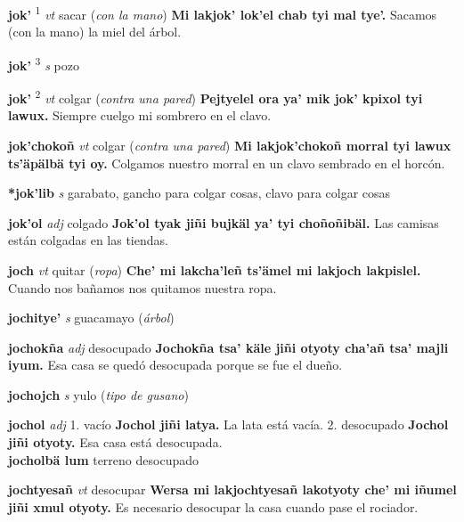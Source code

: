 \documentclass[10pt]{scrbook}
\newcommand{\entry}[1]{\textbf{#1}}
\newcommand{\onedefinition}[1]{#1.}
\newcommand{\defsuperscript}[1]{\textsuperscript{#1}}
\newcommand{\partofspeech}[1]{\textit{#1}}
\newcommand{\spanishtranslation}[1]{#1}
\newcommand{\clarification}[1]{(\textit{#1})}
\newcommand{\cholexample}[1]{\textbf{#1}}
\newcommand{\exampletranslation}[1]{#1}
\newcommand{\secondaryentry}[1]{\\\textbf{#1}}
\newcommand{\secondtranslation}[1]{#1}
\begin{document}
\begin{multicols}{2}
\entry{jok'}
\defsuperscript{1}
\partofspeech{vt}
\spanishtranslation{sacar}
\clarification{con la mano}
\cholexample{Mi lakjok' lok'el chab tyi mal tye'.}
\exampletranslation{Sacamos (con la mano) la miel del árbol.}

\entry{jok'}
\defsuperscript{3}
\partofspeech{s}
\spanishtranslation{pozo}

\entry{jok'}
\defsuperscript{2}
\partofspeech{vt}
\spanishtranslation{colgar}
\clarification{contra una pared}
\cholexample{Pejtyelel ora ya' mik jok' kpixol tyi lawux.}
\exampletranslation{Siempre cuelgo mi sombrero en el clavo.}

\entry{jok'chokoñ}
\partofspeech{vt}
\spanishtranslation{colgar}
\clarification{contra una pared}
\cholexample{Mi lakjok'chokoñ morral tyi lawux ts'äpälbä tyi oy.}
\exampletranslation{Colgamos nuestro morral en un clavo sembrado en el horcón.}

\entry{*jok'lib}
\partofspeech{s}
\spanishtranslation{garabato, gancho para colgar cosas, clavo para colgar cosas}

\entry{jok'ol}
\partofspeech{adj}
\spanishtranslation{colgado}
\cholexample{Jok'ol tyak jiñi bujkäl ya' tyi choñoñibäl.}
\exampletranslation{Las camisas están colgadas en las tiendas.}

\entry{joch}
\partofspeech{vt}
\spanishtranslation{quitar}
\clarification{ropa}
\cholexample{Che' mi lakcha'leñ ts'ämel mi lakjoch lakpislel.}
\exampletranslation{Cuando nos bañamos nos quitamos nuestra ropa.}

\entry{jochitye'}
\partofspeech{s}
\spanishtranslation{guacamayo}
\clarification{árbol}

\entry{jochokña}
\partofspeech{adj}
\spanishtranslation{desocupado}
\cholexample{Jochokña tsa' käle jiñi otyoty cha'añ tsa' majli iyum.}
\exampletranslation{Esa casa se quedó desocupada porque se fue el dueño.}

\entry{jochojch}
\partofspeech{s}
\spanishtranslation{yulo}
\clarification{tipo de gusano}

\entry{jochol}
\partofspeech{adj}
\onedefinition{1}
\spanishtranslation{vacío}
\cholexample{Jochol jiñi latya.}
\exampletranslation{La lata está vacía.}
\onedefinition{2}
\spanishtranslation{desocupado}
\cholexample{Jochol jiñi otyoty.}
\exampletranslation{Esa casa está desocupada.}
\secondaryentry{jocholbä lum}
\secondtranslation{terreno desocupado}

\entry{jochtyesañ}
\partofspeech{vt}
\spanishtranslation{desocupar}
\cholexample{Wersa mi lakjochtyesañ lakotyoty che' mi iñumel jiñi xmul otyoty.}
\exampletranslation{Es necesario desocupar la casa cuando pase el rociador.}


\end{multicols}
\end{document}
